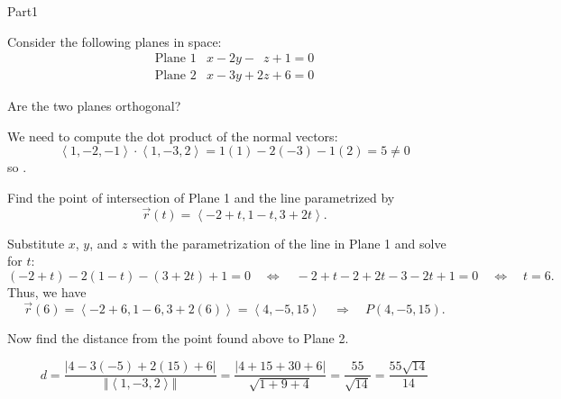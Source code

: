 \documentclass{report}
\newcommand{\norm}[1]{\left\Vert #1 \right\Vert}
\newcommand{\avec}[1]{\left\langle #1 \right\rangle}
\newcommand{\vect}[1]{\overrightarrow{#1}}
\newcommand{\abs}[1]{\left\vert{#1}\right\vert}
\begin{document}
\begin{exam}{Part1}
\begin{problem*}[\auto] Consider the following planes in space:
$$\begin{matrix}
\text{Plane 1} & x-2y-\phantom{2}z+1=0 \\
\text{Plane 2} & x-3y+2z+6=0
\end{matrix}$$
\begin{parts}
\item{} Are the two planes orthogonal?
\begin{solution}[2in] We need to compute the dot product of the normal vectors:
$$\avec{1,-2,-1}\cdot\avec{1,-3,2}=1(1)-2(-3)-1(2)=5\ne 0 $$
so .
\end{solution}
\item{} Find the point of intersection of Plane 1 and the line parametrized by $$\vec{r}(t)=\avec{-2+t,1-t,3+2t}.$$
\begin{solution}[2in] Substitute $x$, $y$, and $z$ with the parametrization of the line in Plane 1 and solve for $t$:
$$(-2+t)-2(1-t)-(3+2t)+1=0 \quad \Longleftrightarrow\quad -2+t-2+2t-3-2t+1=0 \quad \Longleftrightarrow\quad t=6.$$
Thus, we have
$$\vect{r}(6)=\avec{-2+6,1-6,3+2(6)}=\avec{4,-5,15}\quad \Longrightarrow\quad \boxed{P(4,-5,15)}. $$
\end{solution}
\item{} Now find the distance from the point found above to Plane 2.
\begin{solution}[2in]
$$d=\dfrac{\abs{4-3(-5)+2(15)+6}}{\norm{\avec{1,-3,2}}}=\frac{\abs{4+15+30+6}}{\sqrt{1+9+4}}=\frac{55}{\sqrt{14}}=\boxed{\frac{55\sqrt{14}}{14}} $$
\end{solution}
\end{parts}
\end{problem*}



\end{exam}
\end{document}
